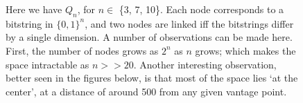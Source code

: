 \begin{figure}[p!]
  \centering

  \caption{Here we have $Q_n$, for $n \in$ \{3, 7, 10\}. Each node corresponds to a bitstring in $\{0,1\}^n$, and two nodes are linked iff the bitstrings differ by a single dimension.  A number of observations can be made here. First, the number of nodes grows as $2^n$ as $n$ grows; which makes the  space intractable as $n>>20$. Another interesting observation, better seen in the figures below, is that most of the space lies `at the center', at a distance of around 500 from any given vantage point.\label{hypercubes}}
\end{figure}

